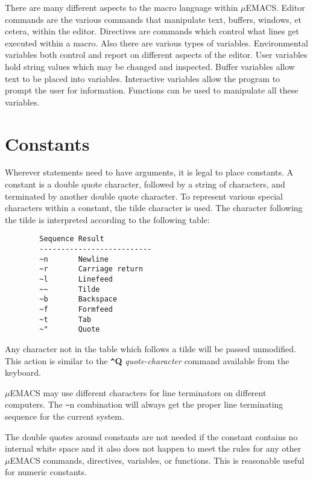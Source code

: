 There are many different aspects to the macro language within
$\mu$EMACS. Editor commands are the various commands that manipulate
text, buffers, windows, et cetera, within the editor. Directives are
commands which control what lines get executed within a macro. Also
there are various types of variables. Environmental variables both
control and report on different aspects of the editor. User variables
hold string values which may be changed and inspected. Buffer variables
allow text to be placed into variables. Interactive variables allow the
program to prompt the user for information. Functions can be used to
manipulate all these variables.

\section{Constants}

Wherever statements need to have arguments, it is legal to place
constants. A constant is a double quote character, followed by a string
of characters, and terminated by another double quote character. To
represent various special characters within a constant, the tilde
character is used. The character following the tilde is interpreted
according to the following table:

\begin{verbatim}
        Sequence Result
        --------------------------
        ~n       Newline
        ~r       Carriage return
        ~l       Linefeed
        ~~       Tilde
        ~b       Backspace
        ~f       Formfeed
        ~t       Tab
        ~"       Quote
\end{verbatim}

Any character not in the table which follows a tilde will be passed
unmodified. This action is similar to the {\bf \verb+^+Q} {\it
quote-character} command available from the keyboard.

$\mu$EMACS may use different characters for line terminators on different
computers. The \verb+~+n combination will always get the proper line
terminating sequence for the current system.

The double quotes around constants are not needed if the constant
contains no internal white space and it also does not happen to meet
the rules for any other $\mu$EMACS commands, directives, variables, or
functions. This is reasonable useful for numeric constants.

